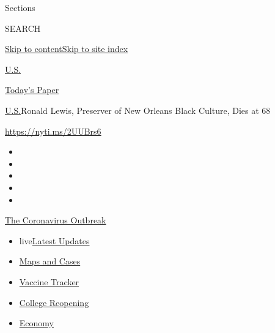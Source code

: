 Sections

SEARCH

\protect\hyperlink{site-content}{Skip to
content}\protect\hyperlink{site-index}{Skip to site index}

\href{https://www.nytimes.com/section/us}{U.S.}

\href{https://myaccount.nytimes.com/auth/login?response_type=cookie\&client_id=vi}{}

\href{https://www.nytimes.com/section/todayspaper}{Today's Paper}

\href{/section/us}{U.S.}\textbar{}Ronald Lewis, Preserver of New Orleans
Black Culture, Dies at 68

\url{https://nyti.ms/2UUBrs6}

\begin{itemize}
\item
\item
\item
\item
\item
\end{itemize}

\href{https://www.nytimes.com/news-event/coronavirus?action=click\&pgtype=Article\&state=default\&region=TOP_BANNER\&context=storylines_menu}{The
Coronavirus Outbreak}

\begin{itemize}
\tightlist
\item
  live\href{https://www.nytimes.com/2020/08/03/world/coronavirus-covid-19.html?action=click\&pgtype=Article\&state=default\&region=TOP_BANNER\&context=storylines_menu}{Latest
  Updates}
\item
  \href{https://www.nytimes.com/interactive/2020/us/coronavirus-us-cases.html?action=click\&pgtype=Article\&state=default\&region=TOP_BANNER\&context=storylines_menu}{Maps
  and Cases}
\item
  \href{https://www.nytimes.com/interactive/2020/science/coronavirus-vaccine-tracker.html?action=click\&pgtype=Article\&state=default\&region=TOP_BANNER\&context=storylines_menu}{Vaccine
  Tracker}
\item
  \href{https://www.nytimes.com/2020/08/02/us/covid-college-reopening.html?action=click\&pgtype=Article\&state=default\&region=TOP_BANNER\&context=storylines_menu}{College
  Reopening}
\item
  \href{https://www.nytimes.com/live/2020/08/03/business/stock-market-today-coronavirus?action=click\&pgtype=Article\&state=default\&region=TOP_BANNER\&context=storylines_menu}{Economy}
\end{itemize}

